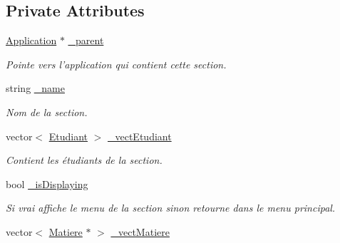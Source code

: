\subsection*{Private Attributes}
\begin{DoxyCompactItemize}
\item 
\hypertarget{class_section_a6968d8f01196bf7d9871479c0a873e3f}{\hyperlink{class_application}{Application} $\ast$ \hyperlink{class_section_a6968d8f01196bf7d9871479c0a873e3f}{\-\_\-parent}}\label{class_section_a6968d8f01196bf7d9871479c0a873e3f}

\begin{DoxyCompactList}\small\item\em Pointe vers l'application qui contient cette section. \end{DoxyCompactList}\item 
\hypertarget{class_section_a2c8c6e23a30debe8d438403e95d3ad44}{string \hyperlink{class_section_a2c8c6e23a30debe8d438403e95d3ad44}{\-\_\-name}}\label{class_section_a2c8c6e23a30debe8d438403e95d3ad44}

\begin{DoxyCompactList}\small\item\em Nom de la section. \end{DoxyCompactList}\item 
\hypertarget{class_section_a5c4caabf8140d37dc7de0419ae61a17b}{vector$<$ \hyperlink{class_etudiant}{Etudiant} $>$ \hyperlink{class_section_a5c4caabf8140d37dc7de0419ae61a17b}{\-\_\-vect\-Etudiant}}\label{class_section_a5c4caabf8140d37dc7de0419ae61a17b}

\begin{DoxyCompactList}\small\item\em Contient les étudiants de la section. \end{DoxyCompactList}\item 
\hypertarget{class_section_af5c63baa9d2747b80cf2c6327e273834}{bool \hyperlink{class_section_af5c63baa9d2747b80cf2c6327e273834}{\-\_\-is\-Displaying}}\label{class_section_af5c63baa9d2747b80cf2c6327e273834}

\begin{DoxyCompactList}\small\item\em Si vrai affiche le menu de la section sinon retourne dans le menu principal. \end{DoxyCompactList}\item 
\hypertarget{class_section_af26521f59e8508f8f9cca2e4391240d4}{vector$<$ \hyperlink{class_matiere}{Matiere} $\ast$ $>$ \hyperlink{class_section_af26521f59e8508f8f9cca2e4391240d4}{\-\_\-vect\-Matiere}}\label{class_section_af26521f59e8508f8f9cca2e4391240d4}


\end{DoxyCompactItemize}
